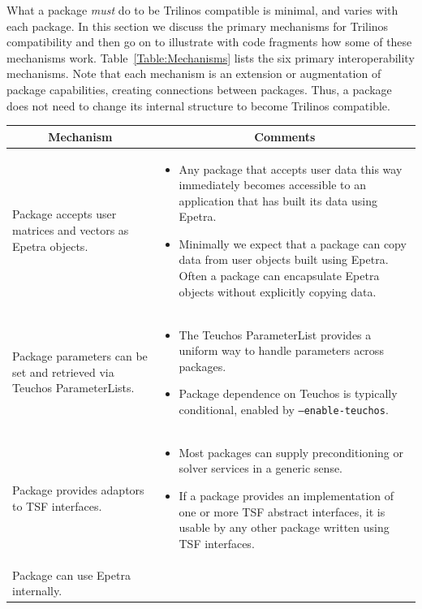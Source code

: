 \documentclass[12pt,relax]{TPA}
\begin{document}
What a package {\it must} do to be Trilinos
compatible is minimal, and varies with each package.  In this section we
discuss the primary mechanisms for Trilinos compatibility
and then go on to illustrate with code fragments how some of these
mechanisms work.  Table~\ref{Table:Mechanisms} lists the six primary
interoperability mechanisms.
Note that each mechanism is an extension or augmentation of package
capabilities, creating connections between packages.  Thus, a package does 
not need to change its internal structure to become Trilinos compatible.
\begin{table}
\begin{center}
\begin{tabular}{|p{1.75in}|p{2.75in}|}\hline
\multicolumn{1}{|c|}{Mechanism} &
\multicolumn{1}{|c|}{Comments}\\\hline
Package accepts user matrices and vectors as Epetra objects. &  
\begin{itemize}
\item Any package
that accepts user data this way immediately becomes accessible to an
application that has built its data using Epetra. 
\item Minimally we expect that a package can copy data from user
objects built using Epetra.  Often a package can encapsulate Epetra
objects without explicitly copying data.  
\end{itemize} \\\hline
Package parameters can be set and retrieved via Teuchos ParameterLists. &
\begin{itemize}
\item The Teuchos ParameterList provides a uniform way to handle parameters
across packages.  
\item Package dependence on Teuchos is typically
conditional, enabled by { \tt --enable-teuchos}. 
\end{itemize}\\\hline 
Package provides adaptors to TSF interfaces. &
\begin{itemize}
\item Most packages can supply preconditioning or solver services in a
generic sense.
\item If a package provides an implementation of one or more TSF
abstract interfaces, it is usable by any other package written using
TSF interfaces.
\end{itemize}\\\hline
Package can use Epetra internally. &
\begin{itemize}

\end{itemize}
\end{tabular}
\end{center}
\end{table}
\end{document}
